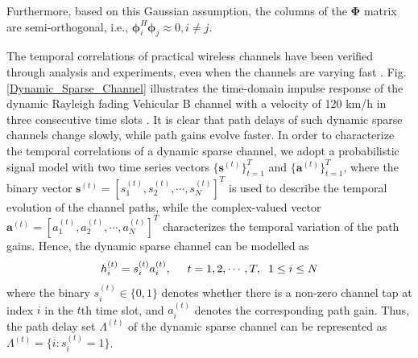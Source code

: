 \documentclass[conference]{IEEEtran}
\begin{document}
Furthermore, based on this Gaussian assumption, the columns of the $\mathbf{\Phi}$ matrix are semi-orthogonal, i.e., $\boldsymbol{\phi}_i^H\boldsymbol{\phi}_j\approx 0, i\neq j$.


The temporal correlations of practical wireless channels have been verified through analysis and experiments, even when the channels are varying fast \cite{dynamic2}. Fig. \ref{Dynamic_Sparse_Channel} illustrates the time-domain impulse response of the dynamic Rayleigh fading Vehicular B channel with a velocity of 120 km/h in three consecutive time slots \cite{Vehicular}. It is clear that path delays of such dynamic sparse channels change slowly, while path gains evolve faster. In order to characterize the temporal correlations of a dynamic sparse channel, we adopt a probabilistic signal model with two time series vectors $\{\mathbf{s}^{(t)}\}_{t=1}^{T}$ and $\{\mathbf{a}^{(t)}\}_{t=1}^{T}$, where the binary vector $\mathbf{s}^{(t)}=[s_1^{(t)}, s_2^{(t)}, \cdots, s_N^{(t)}]^T$ is used to describe the temporal evolution of the channel paths, while the complex-valued vector $\mathbf{a}^{(t)}=[a_1^{(t)}, a_2^{(t)}, \cdots, a_N^{(t)}]^T$ characterizes the temporal variation of the path gains. Hence, the dynamic sparse channel can be modelled as
\begin{equation}
\label{h=salpha}
h_i^{(t)}=s_i^{(t)} a_i^{(t)},\hspace{0.5cm} t=1, 2, \cdots, T, \hspace{0.2cm}1\leq i\leq N
\end{equation}
where the binary $s_i^{(t)}\in\{0, 1\}$ denotes whether there is a non-zero channel tap at index $i$ in the $t$th time slot, and $a_i^{(t)}$ denotes the corresponding path gain. Thus, the path delay set $\Lambda^{(t)}$ of the dynamic sparse channel can be represented as $\Lambda^{(t)}=\{i:s_i^{(t)}=1\}$.
\end{document}
